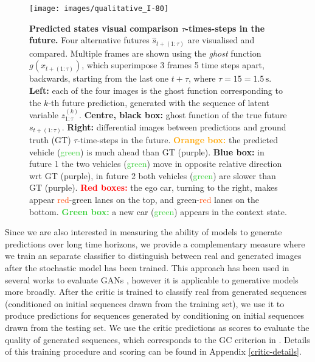 \documentclass{article}
\begin{document}
\begin{figure}[t!]
  \centering
  \texttt{[image: images/qualitative\_I-80]}
  \caption{
    \textbf{Predicted states visual comparison $\tau$-times-steps in the future.}
    Four alternative futures $\hat{s}_{t+(1:\tau)}$ are visualised and compared.
    Multiple frames are shown using the \emph{ghost} function $g(x_{t+(1:\tau)})$, which superimpose 3 frames 5 time steps apart, backwards, starting from the last one $t + \tau$, where $\tau = 15 = 1.5\,\text{s}$.
    \textbf{Left:} each of the four images is the ghost function corresponding to the $k$-th future prediction, generated with the sequence of latent variable $z_{1:\tau}^{(k)}$.
    \textbf{Centre, black box:} ghost function of the true future $s_{t+(1:\tau)}$.
    \textbf{Right:} differential images between predictions  and ground truth (GT) $\tau$-time-steps in the future.
    \textcolor{Orange}{\textbf{Orange box:}} the predicted vehicle (\textcolor{LimeGreen}{green}) is much ahead than GT (\textcolor{Mulberry}{purple}).
    \textcolor{ProcessBlue}{\textbf{Blue box:}} in future 1 the two vehicles (\textcolor{LimeGreen}{green}) move in opposite relative direction wrt GT (\textcolor{Mulberry}{purple}), in future 2 both vehicles (\textcolor{LimeGreen}{green}) are slower than GT (\textcolor{Mulberry}{purple}).
    \textcolor{Red}{\textbf{Red boxes:}} the ego car, turning to the right, makes appear \textcolor{OrangeRed}{red}-\textcolor{PineGreen}{green} lanes on the top, and \textcolor{PineGreen}{green}-\textcolor{OrangeRed}{red} lanes on the bottom.
    \textcolor{LimeGreen}{\textbf{Green box:}} a new car (\textcolor{LimeGreen}{green}) appears in the context state.
  }
  \label{I-80_qual}
\end{figure}

Since we are also interested in measuring the ability of models to generate predictions over long time horizons, we provide a complementary measure where we train an separate classifier to distinguish between real and generated images after the stochastic model has been trained.
This approach has been used in several works to evaluate GANs \citep{Danihelka17, Rosca17, GANeval}, however it is applicable to generative models more broadly.
After the critic is trained to classify real from generated sequences (conditioned on initial sequences drawn from the training set), we use it to produce predictions for sequences generated by conditioning on initial sequences drawn from the testing set.
We use the critic predictions as scores to evaluate the quality of generated sequences, which corresponds to the GC criterion in \citep{GANeval}.
Details of this training procedure and scoring can be found in Appendix \ref{critic-details}.
\end{document}
